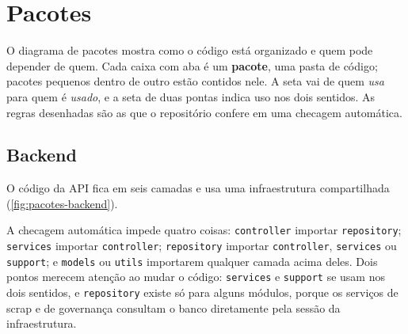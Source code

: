 \section{Pacotes}\label{sec:pacotes}

O diagrama de pacotes mostra como o código está organizado e quem pode depender de quem. Cada caixa com aba é um \textbf{pacote}, uma pasta de código; pacotes pequenos dentro de outro estão contidos nele. A seta vai de quem \emph{usa} para quem é \emph{usado}, e a seta de duas pontas indica uso nos dois sentidos. As regras desenhadas são as que o repositório confere em uma checagem automática.

\subsection{Backend}

O código da API fica em seis camadas e usa uma infraestrutura compartilhada (\autoref{fig:pacotes-backend}).

A checagem automática impede quatro coisas: \texttt{controller} importar \texttt{repository}; \texttt{services} importar \texttt{controller}; \texttt{repository} importar \texttt{controller}, \texttt{services} ou \texttt{support}; e \texttt{models} ou \texttt{utils} importarem qualquer camada acima deles. Dois pontos merecem atenção ao mudar o código: \texttt{services} e \texttt{support} se usam nos dois sentidos, e \texttt{repository} existe só para alguns módulos, porque os serviços de scrap e de governança consultam o banco diretamente pela sessão da infraestrutura.

